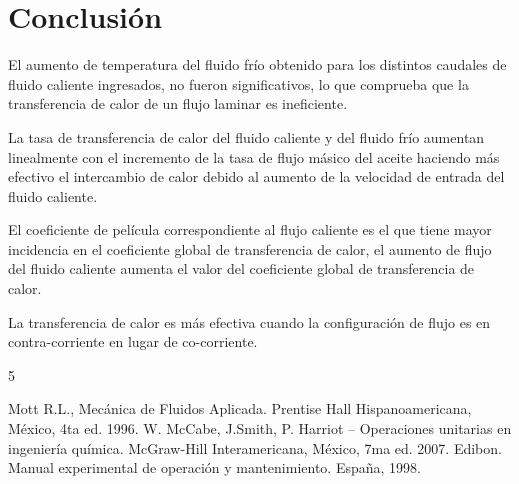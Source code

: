 \documentclass[journal, a4paper]{IEEEtran}
\begin{document}
\section{Conclusi\'on}
	El aumento de temperatura del fluido fr\'io obtenido para los distintos caudales de fluido caliente ingresados, no fueron significativos, lo que comprueba que la transferencia de calor de un flujo laminar es ineficiente.

La tasa de transferencia de calor del fluido caliente y del fluido fr\'io aumentan linealmente con el incremento de la tasa de flujo m\'asico del aceite haciendo m\'as efectivo el intercambio de calor debido al aumento de la velocidad de entrada del fluido caliente. 

El coeficiente de pel\'icula correspondiente al flujo caliente es el que tiene mayor incidencia en el coeficiente global de transferencia de calor, el aumento de flujo del fluido caliente aumenta el valor del coeficiente global de transferencia de calor.

La transferencia de calor es m\'as efectiva cuando la configuraci\'on de flujo es en contra-corriente en lugar de co-corriente.


\begin{thebibliography}{5}

        Mott R.L., Mec\'anica de Fluidos Aplicada. Prentise Hall Hispanoamericana, M\'exico, 4ta ed. 1996.
		W. McCabe, J.Smith, P. Harriot – Operaciones unitarias en ingenier\'ia qu\'imica. McGraw-Hill Interamericana, M\'exico, 7ma ed. 2007.
    	Edibon. Manual experimental de operaci\'on y mantenimiento. España, 1998.

\end{thebibliography}
\end{document}

